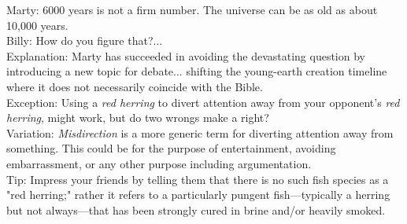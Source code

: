 \documentclass[a4paper,12pt,single,pdftex]{scrbook}
\begin{document}
{      
        Marty: 6000 years is not a firm number.  The universe can be as old as about 10,000 years.
      \\

      
        Billy: How do you figure that?...
      \\

      
        Explanation: Marty has succeeded in avoiding the devastating question by introducing a new topic for debate... shifting the young-earth creation timeline where it does not necessarily coincide with the Bible.
      \\

      
        Exception: Using a {\it red herring} to divert attention away from your opponent's {\it red herring}, might work, but do two wrongs make a right?
      \\

      
        Variation: {\em Misdirection} is a more generic term for diverting attention away from something. This could be for the purpose of entertainment, avoiding embarrassment, or any other purpose including argumentation.
      \\

      
        Tip: Impress your friends by telling them that there is no such fish species as a "red herring;" rather it refers to a particularly pungent fish—typically a herring but not always—that has been strongly cured in brine and/or heavily smoked.
      \\

    
  }
\end{document}
